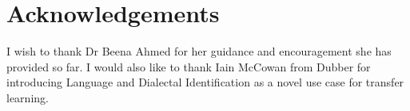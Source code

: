 \chapter*{Acknowledgements}\label{ack}
I wish to thank Dr Beena Ahmed for her guidance and encouragement she has 
provided so far. I would also like to thank Iain McCowan from Dubber for introducing 
Language and Dialectal Identification as a novel use case for transfer learning.  
